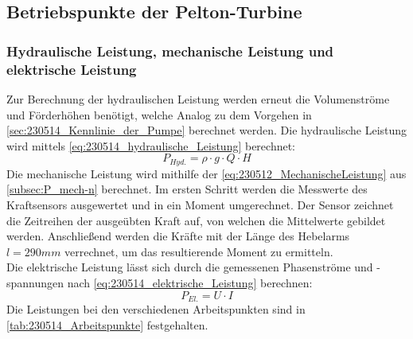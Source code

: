 \subsection{Betriebspunkte der Pelton-Turbine}
\subsubsection{Hydraulische Leistung, mechanische Leistung und elektrische Leistung}
Zur Berechnung der hydraulischen Leistung werden erneut die Volumenströme und Förderhöhen benötigt, welche Analog zu dem Vorgehen in \autoref{sec:230514_Kennlinie_der_Pumpe} berechnet werden.
Die hydraulische Leistung wird mittels \autoref{eq:230514_hydraulische_Leistung} berechnet:
\begin{equation}
  P_{Hyd.} = \rho \cdot g \cdot Q \cdot H
  \label{eq:230514_hydraulische_Leistung}
\end{equation}
Die mechanische Leistung wird mithilfe der \autoref{eq:230512_MechanischeLeistung} aus \autoref{subsec:P_mech-n} berechnet.
Im ersten Schritt werden die Messwerte des Kraftsensors ausgewertet und in ein Moment umgerechnet.
Der Sensor zeichnet die Zeitreihen der ausgeübten Kraft auf, von welchen die Mittelwerte gebildet werden.
Anschließend werden die Kräfte mit der Länge des Hebelarms $l = 290 mm$ verrechnet, um das resultierende Moment zu ermitteln.\\
Die elektrische Leistung lässt sich durch die gemessenen Phasenströme und -spannungen nach \autoref{eq:230514_elektrische_Leistung} berechnen:
\begin{equation}
  P_{El.} = U \cdot I
  \label{eq:230514_elektrische_Leistung}
\end{equation}
Die Leistungen bei den verschiedenen Arbeitspunkten sind in \autoref{tab:230514_Arbeitspunkte} festgehalten.

